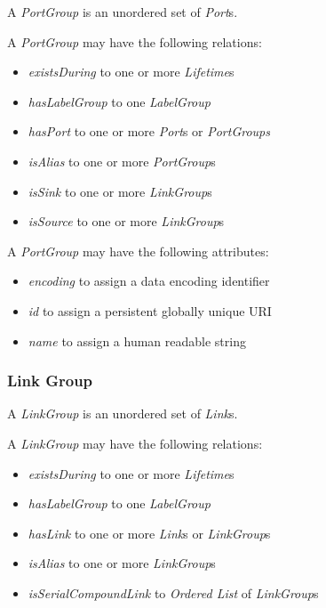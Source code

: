 A \emph{PortGroup} is an unordered set of \emph{Port}s.

A \emph{PortGroup} may have the following relations:
\begin{itemize}
    \item \emph{existsDuring} to one or more \emph{Lifetime}s
    \item \emph{hasLabelGroup} to one \emph{LabelGroup}
    \item \emph{hasPort} to one or more \emph{Port}s or \emph{PortGroups}
    \item \emph{isAlias} to one or more \emph{PortGroup}s
    \item \emph{isSink} to one or more \emph{LinkGroup}s
    \item \emph{isSource} to one or more \emph{LinkGroup}s
\end{itemize}

A \emph{PortGroup} may have the following attributes:
\begin{itemize}
    \item \emph{encoding} to assign a data encoding identifier
    \item \emph{id} to assign a persistent globally unique URI
    \item \emph{name} to assign a human readable string
\end{itemize}



\subsubsection{Link Group}%
\label{class:link_group}

A \emph{LinkGroup} is an unordered set of \emph{Link}s.

A \emph{LinkGroup} may have the following relations:
\begin{itemize}
    \item \emph{existsDuring} to one or more \emph{Lifetime}s
    \item \emph{hasLabelGroup} to one \emph{LabelGroup}
    \item \emph{hasLink} to one or more \emph{Link}s or \emph{LinkGroup}s
    \item \emph{isAlias} to one or more \emph{LinkGroup}s
    \item \emph{isSerialCompoundLink} to \emph{Ordered List} of \emph{LinkGroup}s
\end{itemize}

